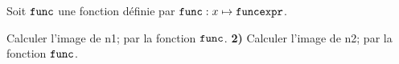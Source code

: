 \documentclass[exercice]{thedocument}%
\begin{document}
%
Soit $\<func;$ une fonction définie par $\<func;:x\mapsto\<funcexpr;$.\par
{}Calculer l'image de \<n1; par la fonction $\<func;$.
\vskip80pt
{\bfseries 2) }Calculer l'image de \<n2; par la fonction $\<func;$.\vskip80pt
\end{document}
